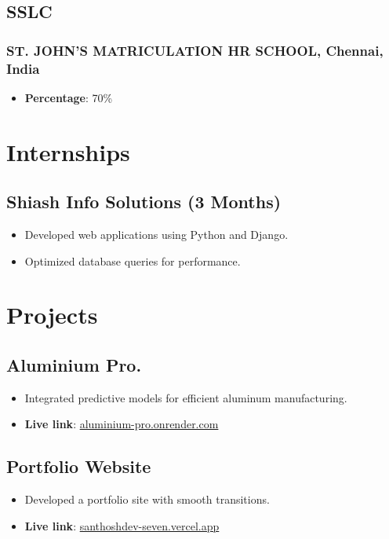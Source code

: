 \documentclass[11pt]{article}
\begin{document}
\subsection{SSLC \hfill {}}  
\subsubsection{ST. JOHN'S MATRICULATION HR SCHOOL, Chennai, India}
\begin{itemize}
    \item \textbf{Percentage}: 70\%
\end{itemize}

\section{Internships}
\subsection{Shiash Info Solutions (3 Months)}
\begin{itemize}
    \item Developed web applications using Python and Django.
    \item Optimized database queries for performance.
\end{itemize}

\section{Projects}
\subsection{Aluminium Pro.} 
\begin{itemize}
    \item Integrated predictive models for efficient aluminum manufacturing. 
    \item \textbf{Live link}: \href{https://aluminium-pro.onrender.com/}{aluminium-pro.onrender.com}
\end{itemize}
\subsection{Portfolio Website} 
\begin{itemize}
    \item Developed a portfolio site with smooth transitions.
    \item \textbf{Live link}: \href{https://santhoshdev-seven.vercel.app/}{santhoshdev-seven.vercel.app}
\end{itemize}
\end{document}
